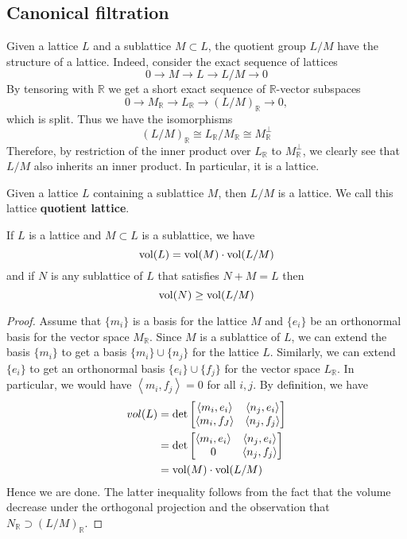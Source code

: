 \subsection{Canonical filtration}
Given a lattice $L$ and a sublattice $M \subset L$, the quotient group $L/M$ have the structure of
a lattice. Indeed, consider the exact sequence of lattices
\[0\rightarrow M\rightarrow L\rightarrow L/M\rightarrow 0\]
By tensoring with $\mathbb{R}$ we get a short exact sequence of $\mathbb{R}$-vector subspaces
\[0\rightarrow M_\mathbb{R} \rightarrow L_\mathbb{R} \rightarrow (L/M)_\mathbb{R}\rightarrow 0,\]
which is split. Thus we have the isomorphisms
\[(L/M)_\mathbb{R} \cong L_\mathbb{R}/M_\mathbb{R} \cong M^\perp_\mathbb{R}\]
Therefore, by restriction of the inner product over $L_\mathbb{R}$ to $M^\perp_\mathbb{R}$, we clearly see that
$L/M$ also inherits an inner product. In particular, it is a lattice.
\begin{definition}
    Given a lattice $L$ containing a sublattice $M$, then $L/M$ is a lattice. We call this lattice \textbf{quotient lattice}.
\end{definition}
\begin{lemma}\label{volume-of-lattice}
    If $L$ is a lattice and $M\subset L$ is a sublattice, we have
    \[\operatorname{vol}(L) = \operatorname{vol}(M)\cdot \operatorname{vol}(L/M)\]
    and if $N$ is any sublattice of $L$ that satisfies $N+M=L$ then
    \[\operatorname{vol}(N) \ge \operatorname{vol}(L/M)\]
\end{lemma}
\begin{proof}
    Assume that $\{m_i\}$ is a basis for the lattice $M$ and $\{e_i\}$ be an orthonormal basis for the vector space
    $M_\mathbb{R}$. Since $M$ is a sublattice of $L$, we can extend the basis $\{m_i\}$ to get a
    basis $\{m_i\} \cup \{n_j\}$ for the lattice $L$. Similarly, we can extend  $\{e_i\}$ to get an orthonormal
    basis $\{e_i\} \cup \{f_j\}$ for the vector space $L_\mathbb{R}$. In particular, we would have
    $\left\langle m_i,f_j \right\rangle =0$ for all $i,j$.
    By definition, we have
    \begin{align*}
        vol(L) & = \det\begin{bmatrix}
                           \left\langle m_i,e_i\right\rangle  & \left\langle n_j,e_i\right\rangle \\
                           \left\langle m_i,f_J \right\rangle & \left\langle n_j,f_j\right\rangle
                       \end{bmatrix} \\
               & = \det\begin{bmatrix}
                           \left\langle m_i,e_i\right\rangle & \left\langle n_j,e_i\right\rangle \\
                           0                                 & \left\langle n_j,f_j\right\rangle
                       \end{bmatrix}  \\
               & =\operatorname{vol}(M)\cdot \operatorname{vol}(L/M)
    \end{align*}
    Hence we are done. The latter inequality follows from the fact that the volume decrease under the orthogonal projection and the observation that
    $N_\mathbb{R} \supset (L/M)_\mathbb{R}$.
\end{proof}
